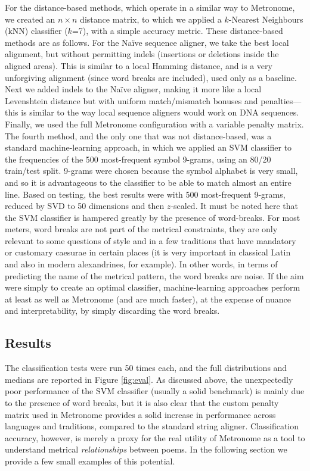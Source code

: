 \documentclass[
    hf
]{ceurart}
\begin{document}
For the distance-based methods, which operate in a similar way to Metronome, we created an $n \times n$ distance matrix, to which we applied a $k$-Nearest Neighbours (kNN) classifier ($k$=7), with a simple accuracy metric. These distance-based methods are as follows. For the Naïve sequence aligner, we take the best local alignment, but without permitting indels (insertions or deletions inside the aligned areas). This is similar to a local Hamming distance, and is a very unforgiving alignment (since word breaks are included), used only as a baseline. Next we added indels to the Naïve aligner, making it more like a local Levenshtein distance but with uniform match/mismatch bonuses and penalties—this is similar to the way local sequence aligners would work on DNA sequences. Finally, we used the full Metronome configuration with a variable penalty matrix. The fourth method, and the only one that was not distance-based, was a standard machine-learning approach, in which we applied an SVM classifier to the frequencies of the 500 most-frequent symbol 9-grams, using an 80/20 train/test split. 9-grams were chosen because the symbol alphabet is very small, and so it is advantageous to the classifier to be able to match almost an entire line. Based on testing, the best results were with 500 most-frequent 9-grams, reduced by SVD to 50 dimensions and then $z$-scaled. It must be noted here that the SVM classifier is hampered greatly by the presence of word-breaks. For most meters, word breaks are not part of the metrical constraints, they are only relevant to some questions of style and in a few traditions that have mandatory or customary caesurae in certain places (it is very important in classical Latin and also in modern alexandrines, for example). In other words, in terms of predicting the name of the metrical pattern, the word breaks are noise. If the aim were simply to create an optimal classifier, machine-learning approaches perform at least as well as Metronome (and are much faster), at the expense of nuance and interpretability, by simply discarding the word breaks.

\subsection{Results}

The classification tests were run 50 times each, and the full distributions and medians are reported in Figure \ref{fig:eval}. As discussed above, the unexpectedly poor performance of the SVM classifier (usually a solid benchmark) is mainly due to the presence of word breaks, but it is also clear that the custom penalty matrix used in Metronome provides a solid increase in performance across languages and traditions, compared to the standard string aligner. Classification accuracy, however, is merely a proxy for the real utility of Metronome as a tool to understand metrical \textit{relationships} between poems. In the following section we provide a few small examples of this potential.
\end{document}
